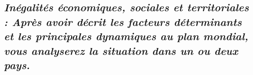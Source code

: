 \newpage \begin{center}
	\subsection*{\textit{Inégalités économiques, sociales et territoriales : Après avoir décrit les facteurs déterminants et les principales dynamiques au plan mondial, vous analyserez la situation dans un ou deux pays.}}
\end{center}